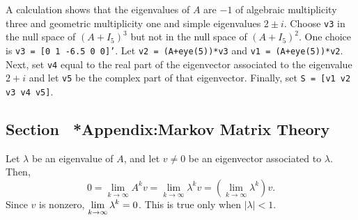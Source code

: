 \documentclass{ximera}
\begin{document}
\soln  A \Matlab calculation shows that the eigenvalues of $A$ are $-1$ of 
algebraic multiplicity three and geometric multiplicity one and simple 
eigenvalues $2\pm i$.  Choose {\tt v3} in the null space of $(A+I_5)^3$ but not in the null space of 
$(A+I_5)^2$.  One choice is {\tt v3 = [0 1 -6.5 0 0]'}.  Let {\tt v2 = (A+eye(5))*v3}
and {\tt v1 = (A+eye(5))*v2}.  Next, set {\tt v4} equal to the real part of the
eigenvector associated to the eigenvalue $2+i$ and let {\tt v5} be the complex part of
that eigenvector.  Finally, set {\tt S = [v1 v2 v3 v4 v5]}.


\subsection*{Section~\protect{\ref{S:TransitionTheory}} *Appendix:Markov Matrix
Theory}

Let $\lambda$ be an eigenvalue of $A$, and let $v \neq 0$ be an eigenvector
associated to $\lambda$.  Then,
\[
0 = \lim_{k \to \infty}A^kv = \lim_{k \to \infty}\lambda^kv
= \left(\lim_{k \to \infty}\lambda^k\right)v.
\]
Since $v$ is nonzero,
$\displaystyle \lim_{k \to \infty}\lambda^k = 0$.  This is true only when
$|\lambda| < 1$.



 
\end{document}
